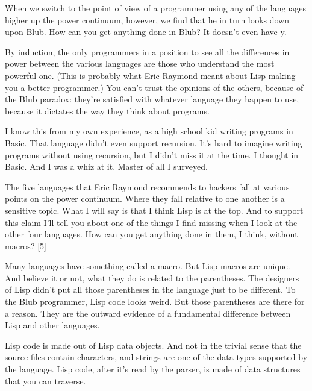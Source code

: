 When
                  we switch to the point of view of a programmer using any of
                  the languages higher up the power continuum, however, we find
                  that he in turn looks down upon Blub. How can you get anything
                  done in Blub? It doesn't even have y.

By induction,
                  the only programmers in a position to see all the differences
                  in power between the various languages are those who
                  understand the most powerful one. (This is probably what Eric
                  Raymond meant about Lisp making you a better programmer.) You
                  can't trust the opinions of the others, because of the Blub
                  paradox: they're satisfied with whatever language they happen
                  to use, because it dictates the way they think about
                  programs.

I know this from my own experience, as a
                  high school kid writing programs in Basic. That language
                  didn't even support recursion. It's hard to imagine writing
                  programs without using recursion, but I didn't miss it at the
                  time. I thought in Basic. And I was a whiz at it. Master of
                  all I surveyed.

The five languages that Eric
                  Raymond recommends to hackers fall at various points on the
                  power continuum. Where they fall relative to one another is a
                  sensitive topic. What I will say is that I think Lisp is at
                  the top. And to support this claim I'll tell you about one of
                  the things I find missing when I look at the other four
                  languages. How can you get anything done in them, I think,
                  without macros? [5]

Many languages have something
                  called a macro. But Lisp macros are unique. And believe it or
                  not, what they do is related to the parentheses. The designers
                  of Lisp didn't put all those parentheses in the language just
                  to be different. To the Blub programmer, Lisp code looks
                  weird. But those parentheses are there for a reason. They are
                  the outward evidence of a fundamental difference between Lisp
                  and other languages.

Lisp code is made out of Lisp
                  data objects. And not in the trivial sense that the source
                  files contain characters, and strings are one of the data
                  types supported by the language. Lisp code, after it's read by
                  the parser, is made of data structures that you can
                  traverse.

